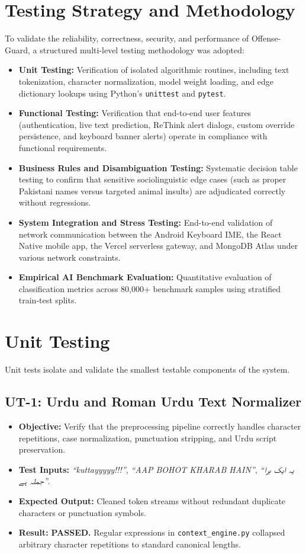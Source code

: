 \documentclass[A4paper,12pt]{report}
\theoremstyle{plain}
\theoremstyle{definition}
\theoremstyle{remark}
\numberwithin{equation}{section}
\begin{document}
\section{Testing Strategy and Methodology}
To validate the reliability, correctness, security, and performance of Offense-Guard, a structured multi-level testing methodology was adopted:
\begin{itemize}[leftmargin=*]
    \item \textbf{Unit Testing:} Verification of isolated algorithmic routines, including text tokenization, character normalization, model weight loading, and edge dictionary lookups using Python's \texttt{unittest} and \texttt{pytest}.
    \item \textbf{Functional Testing:} Verification that end-to-end user features (authentication, live text prediction, ReThink alert dialogs, custom override persistence, and keyboard banner alerts) operate in compliance with functional requirements.
    \item \textbf{Business Rules and Disambiguation Testing:} Systematic decision table testing to confirm that sensitive sociolinguistic edge cases (such as proper Pakistani names versus targeted animal insults) are adjudicated correctly without regressions.
    \item \textbf{System Integration and Stress Testing:} End-to-end validation of network communication between the Android Keyboard IME, the React Native mobile app, the Vercel serverless gateway, and MongoDB Atlas under various network constraints.
    \item \textbf{Empirical AI Benchmark Evaluation:} Quantitative evaluation of classification metrics across 80,000+ benchmark samples using stratified train-test splits.
\end{itemize}

\section{Unit Testing}
Unit tests isolate and validate the smallest testable components of the system.

\subsection{UT-1: Urdu and Roman Urdu Text Normalizer}
\begin{itemize}[leftmargin=*]
    \item \textbf{Objective:} Verify that the preprocessing pipeline correctly handles character repetitions, case normalization, punctuation stripping, and Urdu script preservation.
    \item \textbf{Test Inputs:} \textit{``kuttayyyyy!!!''}, \textit{``AAP BOHOT KHARAB HAIN''}, \textit{``یہ ایک برا جملہ ہے''}.
    \item \textbf{Expected Output:} Cleaned token streams without redundant duplicate characters or punctuation symbols.
    \item \textbf{Result:} \textbf{PASSED.} Regular expressions in \texttt{context\_engine.py} collapsed arbitrary character repetitions to standard canonical lengths.
\end{itemize}
\end{document}
